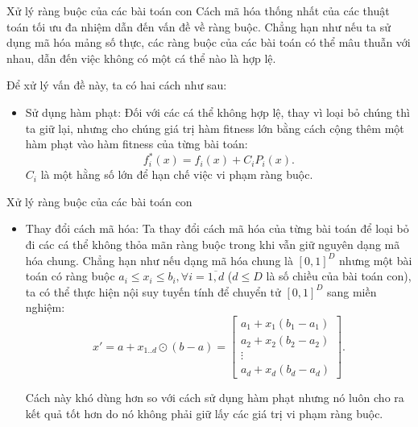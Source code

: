 \begin{frame}{Xử lý ràng buộc của các bài toán con}
  Cách mã hóa thống nhất của các thuật toán tối ưu đa nhiệm dẫn đến vấn đề về
  ràng buộc. Chẳng hạn như nếu ta sử dụng mã hóa mảng số thực, các ràng buộc của
  các bài toán có thể mâu thuẫn với nhau, dẫn đến việc không có một cá thể nào
  là hợp lệ.

  Để xử lý vấn đề này, ta có hai cách như sau:

  \begin{itemize}
  \item Sử dụng hàm phạt: Đối với các cá thể không hợp lệ, thay vì loại bỏ chúng
    thì ta giữ lại, nhưng cho chúng giá trị hàm fitness lớn bằng cách cộng thêm
    một hàm phạt vào hàm fitness của từng bài toán:
    \[
      f^{*}_{i}(x) = f_{i}(x) + C_{i}P_{i}(x)
    .\] 
    \( C_{i} \) là một hằng số lớn để hạn chế việc vi phạm ràng buộc.
  \end{itemize}
\end{frame}

\begin{frame}{Xử lý ràng buộc của các bài toán con}
  \begin{itemize}
  \item Thay đổi cách mã hóa: Ta thay đổi cách mã hóa của từng bài toán để loại
    bỏ đi các cá thể không thỏa mãn ràng buộc trong khi vẫn giữ nguyên dạng mã
    hóa chung. Chẳng hạn như nếu dạng mã hóa chung là \( [0, 1]^{D} \) nhưng một
    bài toán có ràng buộc \( a_{i} \le x_{i} \le b_{i}, \forall i=
    \overline{1,d} \) (\( d \le D\) là số chiều của bài toán con), ta có thể
    thực hiện nội suy tuyến tính để chuyển tử \( [0, 1]^{D} \) sang miền nghiệm:
    \[
      x' = a + x_{1..d} \odot (b - a) = 
      \begin{bmatrix} 
        a_{1} + x_{1}(b_{1}-a_{1})\\
        a_{2} + x_{2}(b_{2}-a_{2})\\
        \vdots \\
        a_{d} + x_{d}(b_{d} - a_{d})
      \end{bmatrix} 
    .\]

    Cách này khó dùng hơn so với cách sử dụng hàm phạt nhưng nó luôn cho ra kết
    quả tốt hơn do nó không phải giữ lấy các giá trị vi phạm ràng buộc.
  \end{itemize}
\end{frame}


